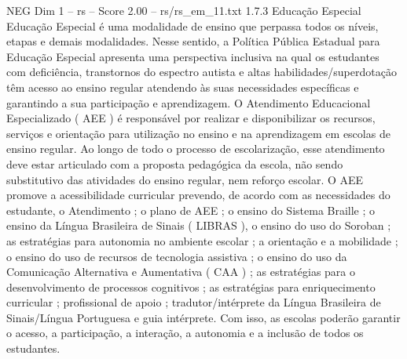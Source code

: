 \begin{textsample}{NEG Dim 1 – rs – Score 2.00 – rs/rs\_em\_11.txt}  \label{ex:f1_neg_085}
1.7.3 Educação Especial Educação Especial é uma modalidade de ensino que perpassa todos os níveis, etapas e demais modalidades.
Nesse sentido, a Política Pública Estadual para Educação Especial apresenta uma perspectiva inclusiva na qual os estudantes com deficiência, transtornos do espectro autista e altas habilidades/superdotação têm acesso ao ensino regular atendendo às suas necessidades específicas e garantindo a sua participação e aprendizagem.
O Atendimento Educacional Especializado ( AEE ) é responsável por realizar e disponibilizar os recursos, serviços e orientação para utilização no ensino e na aprendizagem em escolas de ensino regular.
Ao longo de todo o processo de escolarização, esse atendimento deve estar articulado com a proposta pedagógica da escola, não sendo substitutivo das atividades do ensino regular, nem reforço escolar.
O AEE promove a acessibilidade curricular prevendo, de acordo com as necessidades do estudante, o Atendimento ; o plano de AEE ; o ensino do Sistema Braille ; o ensino da Língua Brasileira de Sinais ( LIBRAS ), o ensino do uso do Soroban ; as estratégias para autonomia no ambiente escolar ; a orientação e a mobilidade ; o ensino do uso de recursos de tecnologia assistiva ; o ensino do uso da Comunicação Alternativa e Aumentativa ( CAA ) ; as estratégias para o desenvolvimento de processos cognitivos ; as estratégias para enriquecimento curricular ; profissional de apoio ; tradutor/intérprete da Língua Brasileira de Sinais/Língua Portuguesa e guia intérprete.
Com isso, as escolas poderão garantir o acesso, a participação, a interação, a autonomia e a inclusão de todos os estudantes.

\end{textsample}
